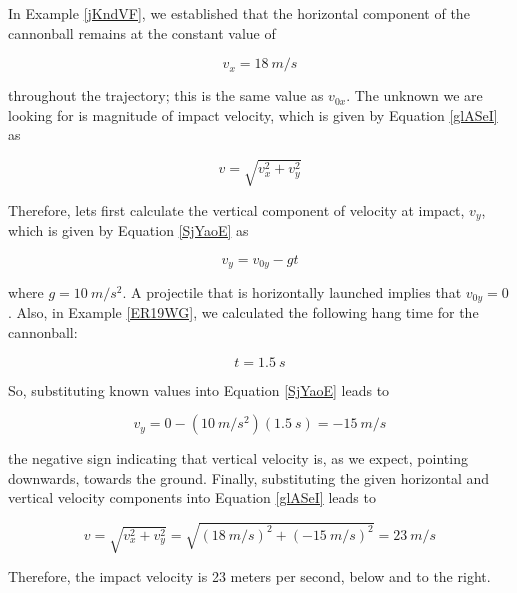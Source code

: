 \documentclass[main-physics.tex]{subfiles}
\begin{document}
\Solution In Example \ref{jKndVF}, we established that the horizontal component of the cannonball remains at the constant value of

\begin{equation*}
    v_x = \SI{18}{m/s}
\end{equation*}

throughout the trajectory; this is the same value as $v_{0x}$. The unknown we are looking for is magnitude of impact velocity, which is given by Equation \eqref{glASeI} as

\begin{equation*}
    v = \sqrt{v_x^2 + v_y^2}
\end{equation*}

Therefore, lets first calculate the vertical component of velocity at impact, $v_y$, which is given by Equation \eqref{SjYaoE} as

\begin{equation*}
    v_y = v_{0y} - gt
\end{equation*}

where $g = \SI{10}{m/s^2}$. A projectile that is horizontally launched implies that $v_{0y} = 0$. Also, in Example \ref{ER19WG}, we calculated the following hang time for the cannonball:

\begin{equation*}
    t = \SI{1.5}{s}
\end{equation*}

So, substituting known values into Equation \eqref{SjYaoE} leads to 

\begin{equation*}
    v_y = 0 - (\SI{10}{m/s^2})(\SI{1.5}{s}) = -\SI{15}{m/s} 
\end{equation*}

the negative sign indicating that vertical velocity is, as we expect, pointing downwards, towards the ground. Finally, substituting the given horizontal and vertical velocity components into Equation \eqref{glASeI} leads to

\begin{equation*}
    v = \sqrt{v_x^2 + v_y^2} = \sqrt{\left(\SI{18}{m/s}\right)^2 + \left(-\SI{15}{m/s}\right)^2} = \SI{23}{m/s}
\end{equation*}

Therefore, the impact velocity is 23 meters per second, below and to the right.
\end{document}
